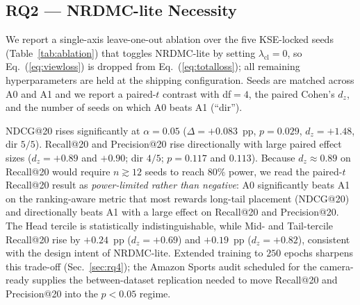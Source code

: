 \documentclass[conference]{IEEEtran}
\begin{document}
\subsection{RQ2 --- NRDMC-lite Necessity}
\label{sec:rq2}

We report a single-axis leave-one-out ablation over the five
KSE-locked seeds (Table~\ref{tab:ablation}) that toggles NRDMC-lite
by setting $\lambda_{\text{cl}}{=}0$, so Eq.~(\ref{eq:viewloss}) is
dropped from Eq.~(\ref{eq:totalloss}); all remaining hyperparameters
are held at the shipping configuration. Seeds are matched across A0
and A1 and we report a paired-$t$ contrast with df$=4$, the paired
Cohen's $d_{z}$, and the number of seeds on which A0 beats A1
(``dir'').

NDCG@20 rises significantly at $\alpha{=}0.05$ ($\Delta{=}+0.083$~pp,
$p{=}0.029$, $d_{z}{=}+1.48$, dir $5/5$). Recall@20 and Precision@20
rise directionally with large paired effect sizes
($d_{z}{=}+0.89$ and $+0.90$; dir $4/5$; $p{=}0.117$ and $0.113$).
Because $d_{z}{\approx}0.89$ on Recall@20 would require
$n{\gtrsim}12$ seeds to reach $80\%$ power, we read the paired-$t$
Recall@20 result as \emph{power-limited rather than negative}: A0
significantly beats A1 on the ranking-aware metric that most rewards
long-tail placement (NDCG@20) and directionally beats A1 with a
large effect on Recall@20 and Precision@20. The Head tercile is
statistically indistinguishable, while Mid- and Tail-tercile
Recall@20 rise by $+0.24$~pp ($d_{z}{=}+0.69$) and $+0.19$~pp
($d_{z}{=}+0.82$), consistent with the design intent of NRDMC-lite.
Extended training to $250$ epochs sharpens this trade-off
(Sec.~\ref{sec:rq4}); the Amazon Sports audit scheduled for the
camera-ready supplies the between-dataset replication needed to
move Recall@20 and Precision@20 into the $p<0.05$ regime.
\end{document}
